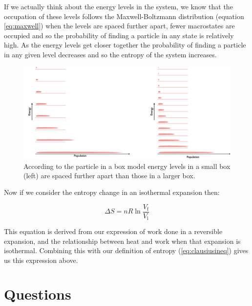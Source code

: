 \documentclass[
]{book}
\begin{document}
If we actually think about the energy levels in the system, we know that the occupation of these levels follows the Maxwell-Boltzmann distribution (equation \eqref{eq:maxwell}) when the levels are spaced further apart, fewer macrostates are occupied and so the probability of finding a particle in any state is relatively high. As the energy levels get closer together the probability of finding a particle in any given level decreases and so the entropy of the system increases.

\begin{figure}

{\centering \includegraphics[width=0.8\linewidth]{images/boxlevels} 

}

\caption{According to the particle in a box model energy levels in a small box (left) are spaced further apart than those in a larger box.}\label{fig:boxlevels}
\end{figure}

Now if we consider the entropy change in an isothermal expansion then:

\begin{equation}
\Delta S=nR \ln\frac{V_\textrm{f}}{V_\textrm{i}}
\label{eq:entropyexpansion}
\end{equation}

This equation is derived from our expression of work done in a reversible expansion, and the relationship between heat and work when that expansion is isothermal. Combining this with our definition of entropy (\eqref{eq:clausiusineq}) gives us this expression above.

\hypertarget{sec:w3p2question}{%
\section{Questions}\label{sec:w3p2question}}
\end{document}
